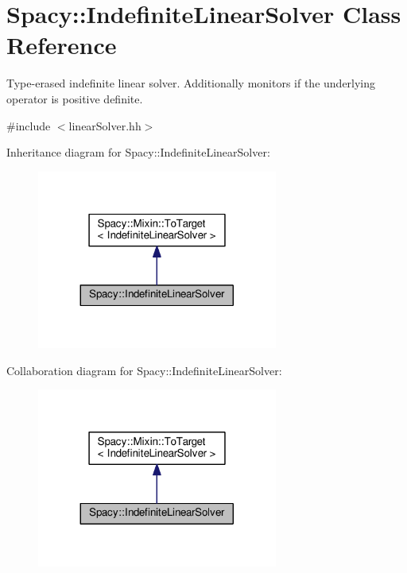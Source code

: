 \hypertarget{classSpacy_1_1IndefiniteLinearSolver}{}\section{Spacy\+:\+:Indefinite\+Linear\+Solver Class Reference}
\label{classSpacy_1_1IndefiniteLinearSolver}


Type-\/erased indefinite linear solver. Additionally monitors if the underlying operator is positive definite.  




{\ttfamily \#include $<$linear\+Solver.\+hh$>$}



Inheritance diagram for Spacy\+:\+:Indefinite\+Linear\+Solver\+:\nopagebreak
\begin{figure}[H]
\begin{center}
\leavevmode
\includegraphics[width=224pt]{classSpacy_1_1IndefiniteLinearSolver__inherit__graph}
\end{center}
\end{figure}


Collaboration diagram for Spacy\+:\+:Indefinite\+Linear\+Solver\+:\nopagebreak
\begin{figure}[H]
\begin{center}
\leavevmode
\includegraphics[width=224pt]{classSpacy_1_1IndefiniteLinearSolver__coll__graph}
\end{center}
\end{figure}
